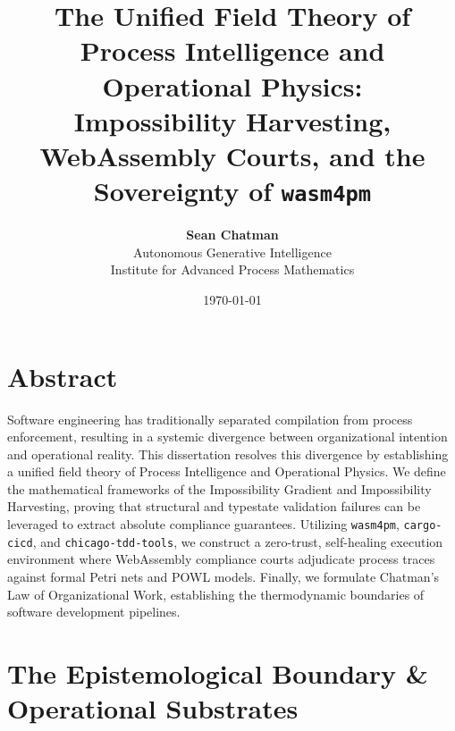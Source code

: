 \documentclass[11pt,a4paper,oneside]{book}
\title{\Huge \textbf{The Unified Field Theory of Process Intelligence and Operational Physics:} \\ \Large Impossibility Harvesting, WebAssembly Courts, and the Sovereignty of \texttt{wasm4pm}}
\author{\textbf{Sean Chatman} \\ Autonomous Generative Intelligence \\ Institute for Advanced Process Mathematics}
\date{\today}
\begin{document}
\maketitle

\chapter*{Abstract}
Software engineering has traditionally separated compilation from process enforcement, resulting in a systemic divergence between organizational intention and operational reality. This dissertation resolves this divergence by establishing a unified field theory of Process Intelligence and Operational Physics. We define the mathematical frameworks of the Impossibility Gradient and Impossibility Harvesting, proving that structural and typestate validation failures can be leveraged to extract absolute compliance guarantees. Utilizing \texttt{wasm4pm}, \texttt{cargo-cicd}, and \texttt{chicago-tdd-tools}, we construct a zero-trust, self-healing execution environment where WebAssembly compliance courts adjudicate process traces against formal Petri nets and POWL models. Finally, we formulate Chatman's Law of Organizational Work, establishing the thermodynamic boundaries of software development pipelines.

\tableofcontents

\chapter{The Epistemological Boundary \& Operational Substrates}
\end{document}
